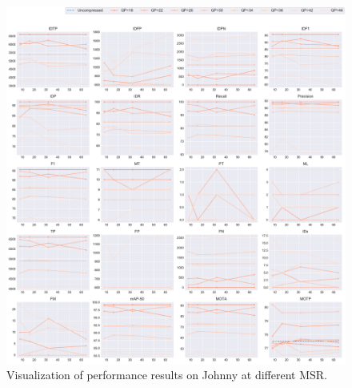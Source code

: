 \begin{figure}[!htbp]
\centering
\includegraphics[width=1.0\linewidth]{img/appendix/Johnny_all_multiplots_msr.pdf}
\caption[Visualization of performance results on Johnny at different MSR]
{Visualization of performance results on Johnny at different MSR.}
\label{fig:Johnny_all_msr}
\end{figure}



